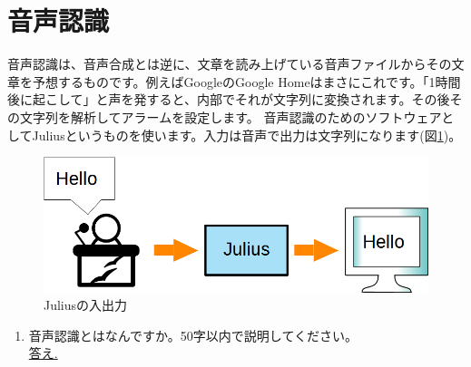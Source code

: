 \section{音声認識}
音声認識は、音声合成とは逆に、文章を読み上げている音声ファイルからその文章を予想するものです。例えばGoogleのGoogle Homeはまさにこれです。「1時間後に起こして」と声を発すると、内部でそれが文字列に変換されます。その後その文字列を解析してアラームを設定します。
音声認識のためのソフトウェアとしてJuliusというものを使います。入力は音声で出力は文字列になります(図\ref{})。

\begin{figure}[H]
\begin{center}
    \includegraphics[width=\linewidth]{images/chap06/text06-img002.png}
    \caption{Juliusの入出力}
    \label{Juliusの入出力}
\end{center}
\end{figure}

\begin{tcolorbox}[title=\useOmetoi]
\begin{enumerate}
\item 音声認識とはなんですか。50字以内で説明してください。\\
\underline{答え.\hspace{0.8\linewidth}}
\end{enumerate}
\end{tcolorbox}